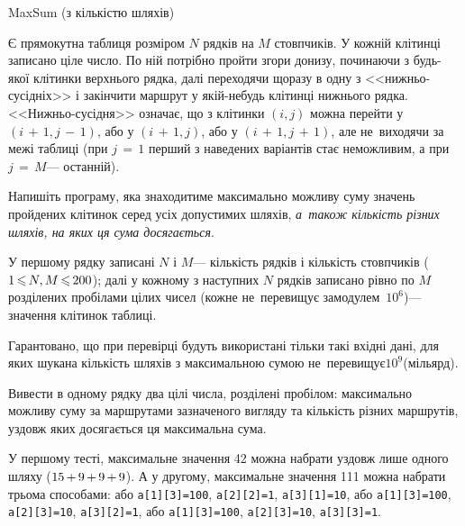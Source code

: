 ﻿\begin{problemAllDefault}{MaxSum (з кількістю шляхів)}\label{problem:maxsum-with-quantity}

Є прямокутна таблиця розміром $N$ рядків на $M$ стовпчиків. У кожній клітинці записано ціле число. 
По ній потрібно пройти згори донизу, починаючи з будь-якої клітинки верхнього рядка, 
далі переходячи щоразу в одну з <<нижньо-сусідніх>> і закінчити маршрут у якій-небудь клітинці нижнього рядка. 
<<Нижньо-сусідня>> означає, що з клітинки $(i,j)$ можна перейти у ${(i\,{+}\,1,j\,{-}\,1)}$, 
або у ${(i\,{+}\,1,j)}$, або у ${(i\,{+}\,1,j\,{+}\,1)}$, але не~виходячи за межі таблиці 
(при ${j\,{=}\,1}$ перший з наведених варіантів стає неможливим, а при ${j\,{=}\,M}$\nolinebreak[3] --- останній).

Напишіть програму, яка знаходитиме максимально можливу суму значень пройдених клітинок 
серед усіх допустимих шляхів, \emph{а~також кількість різних шляхів, на яких ця сума досягається}.

\InputFile  
У першому рядку записані $N$ і $M$\nolinebreak[3] --- кількість рядків і кількість стовпчиків 
(${1\,{\leqslant}\,N, M\,{\leqslant}\,200}$); далі у кожному з наступних $N$ рядків 
записано рівно по $M$ розділених пробілами цілих чисел 
(кожне не~перевищує за\nolinebreak[2] модулем~$10^6$)\nolinebreak[3] --- значення клітинок таблиці.

Гарантовано, що при перевірці будуть використані тільки такі вхідні дані, 
для яких шукана кількість шляхів з максимальною сумою 
не~перевищує\nolinebreak[2] $10^9$\nolinebreak[3] (мільярд).

\OutputFile
Вивести в одному рядку два цілі числа, розділені пробілом: 
максимально можливу суму за маршрутами зазначеного вигляду
та кількість різних маршрутів, уздовж яких 
досягається ця максимальна сума.

\Example
\begin{example}%

\end{example}

\Note
У першому тесті, максимальне значення 42 можна набрати 
уздовж лише одного шляху ($15\dib{{+}}9\dib{{+}}9\dib{{+}}9$). 
А у другому, максимальне значення 111 можна набрати трьома способами: 
або \verb"a[1][3]=100", \verb"a[2][2]=1", \verb"a[3][1]=10", 
або \verb"a[1][3]=100", \verb"a[2][3]=10", \verb"a[3][2]=1", 
або \verb"a[1][3]=100", \verb"a[2][3]=10", \verb"a[3][3]=1".


\end{problemAllDefault}
